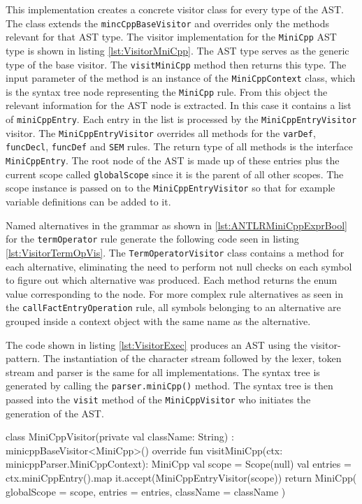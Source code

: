 This implementation creates a concrete visitor class for every type     of the AST. The class extends the \verb|mincCppBaseVisitor| and overrides only the methods relevant for that AST type. The visitor implementation for the \verb|MiniCpp| AST type is shown in listing \ref{lst:VisitorMniCpp}. The AST type serves as the generic type of the base visitor. The \verb|visitMiniCpp| method then returns this type. The input parameter of the method is an instance of the \verb|MiniCppContext| class, which is the syntax tree node representing the \verb|MiniCpp| rule. From this object the relevant information for the AST node is extracted. In this case it contains a list of \verb|miniCppEntry|. Each entry in the list is processed by the \verb|MiniCppEntryVisitor| visitor. The \verb|MiniCppEntryVisitor| overrides all methods for the \verb|varDef|, \verb|funcDecl|, \verb|funcDef| and \verb|SEM| rules. The return type of all methods is the interface \verb|MiniCppEntry|. The root node of the AST is made up of these entries plus the current scope called \verb|globalScope| since it is the parent of all other scopes. The scope instance is passed on to the \verb|MiniCppEntryVisitor| so that for example variable definitions can be added to it.

Named alternatives in the grammar as shown in \ref{lst:ANTLRMiniCppExprBool} for the \verb|termOperator| rule generate the following code seen in listing \ref{lst:VisitorTermOpVis}. The \verb|TermOperatorVisitor| class contains a method for each alternative, eliminating the need to perform not null checks on each symbol to figure out which alternative was produced. Each method returns the enum value corresponding to the node. For more complex rule alternatives as seen in the \verb|callFactEntryOperation| rule, all symbols belonging to an alternative are grouped inside a context object with the same name as the alternative.

The code shown in listing \ref{lst:VisitorExec} produces an AST using the visitor-pattern. The instantiation of the character stream followed by the lexer, token stream and parser is the same for all implementations. The syntax tree is generated by calling the \verb|parser.miniCpp()| method. The syntax tree is then passed into the \verb|visit| method of the \verb|MiniCppVisitor| who initiates the generation of the AST.




\begin{KotlinCode}[float,numbers=none,caption=Implementation of the \texttt{MiniCppVisitor} class., label=lst:VisitorMniCpp]
class MiniCppVisitor(private val className: String) : minicppBaseVisitor<MiniCpp>() 
{
    override fun visitMiniCpp(ctx: minicppParser.MiniCppContext): MiniCpp {
        val scope = Scope(null)
        val entries = ctx.miniCppEntry().map { it.accept(MiniCppEntryVisitor(scope)) }
        return MiniCpp(
            globalScope = scope,
            entries = entries,
            className = className
        )
    }
}
\end{KotlinCode}


